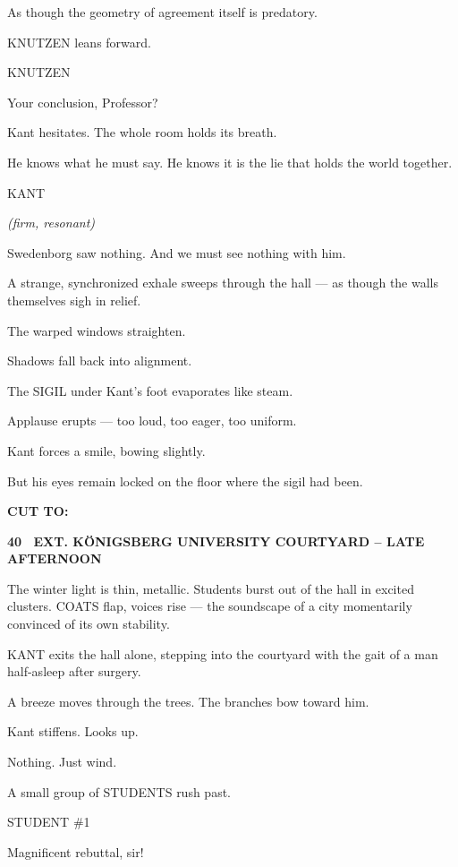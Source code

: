 \documentclass[12pt]{article}
\newcommand{\scene}[2]{%
  \vspace{1.8\baselineskip}%
  \noindent\textbf{#1 \ #2}\par\vspace{0.4\baselineskip}%
}
\newenvironment{dialogue}[1]{%
  \vspace{0.8\baselineskip}%
  \noindent\hspace*{2.3in}\textsc{#1}\par%
  \noindent\hspace*{1.5in}\begin{minipage}[t]{4.5in}%
}{%
  \end{minipage}\par%
}
\newcommand{\paren}[1]{%
  \noindent\hspace*{1.8in}\textit{(#1)}\par%
}
\newcommand{\transition}[1]{%
  \vspace{0.6\baselineskip}%
  \begin{flushright}\textbf{#1}\end{flushright}%
}
\begin{document}
As though the geometry of agreement itself is predatory.

KNUTZEN leans forward.

\begin{dialogue}{KNUTZEN}
Your conclusion, Professor?
\end{dialogue}

Kant hesitates. The whole room holds its breath.

He knows what he must say.
He knows it is the lie that holds the world together.

\begin{dialogue}{KANT}
\paren{firm, resonant}
Swedenborg saw nothing.  
And we must see nothing with him.
\end{dialogue}

A strange, synchronized exhale sweeps through the hall — 
as though the walls themselves sigh in relief.

The warped windows straighten.

Shadows fall back into alignment.

The SIGIL under Kant’s foot evaporates like steam.

Applause erupts — too loud, too eager, too uniform.

Kant forces a smile, bowing slightly.

But his eyes remain locked on the floor where the sigil had been.

\transition{CUT TO:}


\scene{40}{EXT. KÖNIGSBERG UNIVERSITY COURTYARD -- LATE AFTERNOON}

The winter light is thin, metallic. Students burst out of the hall in 
excited clusters. COATS flap, voices rise — the soundscape of a city 
momentarily convinced of its own stability.

KANT exits the hall alone, stepping into the courtyard with the gait 
of a man half-asleep after surgery.

A breeze moves through the trees. The branches bow toward him.

Kant stiffens. Looks up.

Nothing. Just wind.

A small group of STUDENTS rush past.

\begin{dialogue}{STUDENT \#1}
Magnificent rebuttal, sir!
\end{dialogue}
\end{document}
